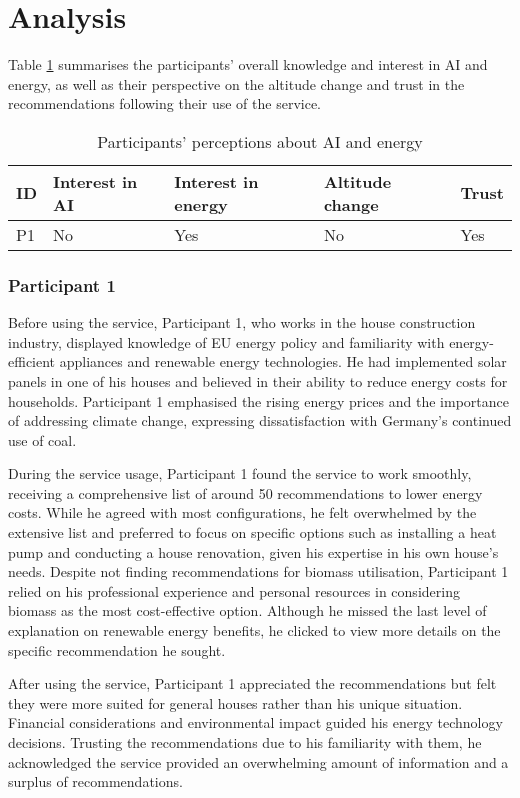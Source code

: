 \section{Analysis}

Table \ref{tab:participants_perceptions} summarises the participants' overall knowledge and interest in AI and energy, 
as well as their perspective on the altitude change and trust in the recommendations following their use of the service.  

\begin{table}[h!]
  \centering
  \begin{tabular}{ | p{} | p{} | p{} | p{} | p{} | } 
    \hline
    ID & Interest in AI & Interest in energy & Altitude change & Trust \\
    \hline
    P1 & No & Yes & No & Yes \\
    \hline
  \end{tabular}
  \caption{Participants' perceptions about AI and energy}
  \label{tab:participants_perceptions}
\end{table}


\subsubsection{Participant 1}

Before using the service, 
Participant 1, who works in the house construction industry, 
displayed knowledge of EU energy policy and familiarity with energy-efficient appliances and renewable energy technologies. 
He had implemented solar panels in one of his houses and believed in their ability to reduce energy costs for households. 
Participant 1 emphasised the rising energy prices and the importance of addressing climate change, expressing dissatisfaction with Germany's continued use of coal. 

During the service usage, 
Participant 1 found the service to work smoothly, receiving a comprehensive list of around 50 recommendations to lower energy costs. 
While he agreed with most configurations, he felt overwhelmed by the extensive list and preferred to focus on specific options such as installing a heat pump and conducting a house renovation, given his expertise in his own house's needs. 
Despite not finding recommendations for biomass utilisation, Participant 1 relied on his professional experience and personal resources in considering biomass as the most cost-effective option. 
Although he missed the last level of explanation on renewable energy benefits, he clicked to view more details on the specific recommendation he sought.

After using the service, 
Participant 1 appreciated the recommendations but felt they were more suited for general houses rather than his unique situation. 
Financial considerations and environmental impact guided his energy technology decisions. 
Trusting the recommendations due to his familiarity with them, he acknowledged the service provided an overwhelming amount of information and a surplus of recommendations.
